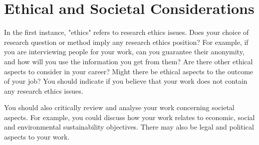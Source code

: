 \section{Ethical and Societal Considerations}

In the first instance, "ethics" refers to research ethics issues. Does your choice of research question or method imply any research ethics position? For example, if you are interviewing people for your work, can you guarantee their anonymity, and how will you use the information you get from them? Are there other ethical aspects to consider in your career? Might there be ethical aspects to the outcome of your job? You should indicate if you believe that your work does not contain any research ethics issues. 

You should also critically review and analyse your work concerning societal aspects. For example, you could discuss how your work relates to economic, social and environmental sustainability objectives. There may also be legal and political aspects to your work. 